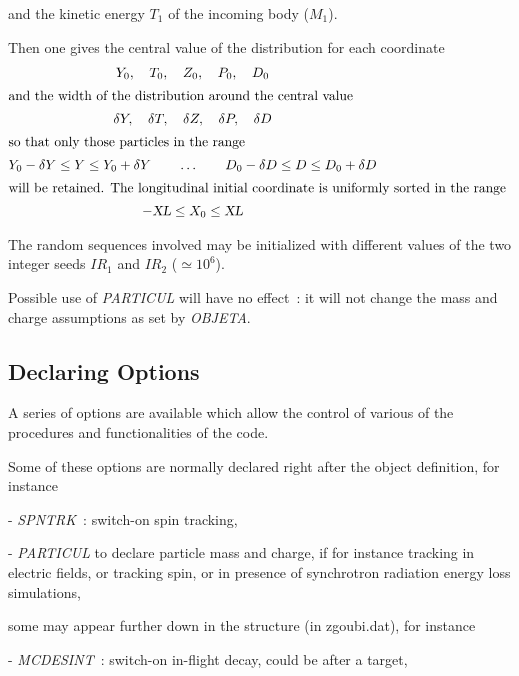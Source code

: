\noindent  and the kinetic energy $ T_1 $ of the incoming body ($M_1$). 
 
\noindent Then one gives the central value of the distribution for each
coordinate 
%
\begin{gather*}
	Y_0,\quad T_0,\quad Z_0,\quad P_0,\quad D_0    \\
\intertext{and the width of the distribution around the central value }
	 \delta Y,\quad \delta T,\quad \delta Z,\quad \delta P,\quad \delta D \\
\intertext{so that only those particles in the range }
	Y_0-\delta Y\leq Y\leq Y_0+\delta Y\qquad \ldots \qquad D_0-\delta
	D\leq D\leq D_0+\delta D  \\
\intertext{will be retained.  The longitudinal initial coordinate is uniformly
	sorted in the range }
	 -\textsl{XL} \leq  X_0 \leq  \textsl{XL} 
\end{gather*}
 
\noindent The random sequences involved may be initialized with different
values of the 
two integer seeds $ IR_1 $ and $ IR_2 $ ($\simeq 10^6 $). 

\bigskip

\noindent Possible use of \textsl{PARTICUL} will have no effect~: it will not change the mass
 and charge assumptions as set  by \textsl{OBJETA}.


\newpage

\subsection{Declaring  Options} \label{sec4.3}

A series of options are available which allow the control of various of the procedures and 
functionalities of the code. 

\medskip

\noindent Some of these options are normally declared right after 
the object definition, for instance 

- \textsl{SPNTRK}~:  switch-on spin tracking, 

- \textsl{PARTICUL} to declare particle mass and charge, if for instance tracking in electric fields, 
or tracking spin, or in presence of synchrotron radiation energy loss simulations, 

\medskip 

\noindent  some may appear further down in the structure (in zgoubi.dat), for instance 

- \textsl{MCDESINT}~: switch-on in-flight decay, could be after a target, 

